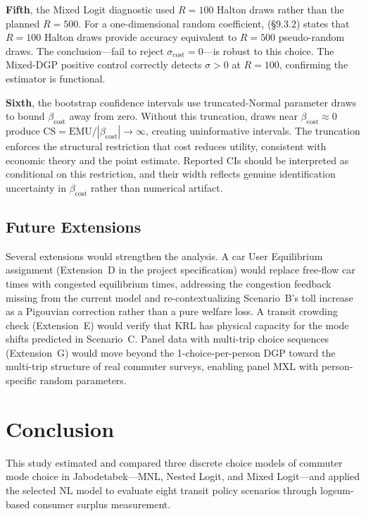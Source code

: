 \documentclass[12pt,a4paper]{article}
\begin{document}
\textbf{Fifth}, the Mixed Logit diagnostic used $R = 100$ Halton draws rather than the planned $R = 500$. For a one-dimensional random coefficient, \citet{train2009} (\S 9.3.2) states that $R = 100$ Halton draws provide accuracy equivalent to $R = 500$ pseudo-random draws. The conclusion---fail to reject $\sigma_{\text{cost}} = 0$---is robust to this choice. The Mixed-DGP positive control correctly detects $\sigma > 0$ at $R = 100$, confirming the estimator is functional.

\textbf{Sixth}, the bootstrap confidence intervals use truncated-Normal parameter draws to bound $\beta_{\text{cost}}$ away from zero. Without this truncation, draws near $\beta_{\text{cost}} \approx 0$ produce $\text{CS} = \text{EMU} / |\beta_{\text{cost}}| \to \infty$, creating uninformative intervals. The truncation enforces the structural restriction that cost reduces utility, consistent with economic theory and the \citet{ilahi2021} point estimate. Reported CIs should be interpreted as conditional on this restriction, and their width reflects genuine identification uncertainty in $\beta_{\text{cost}}$ rather than numerical artifact.

\subsection{Future Extensions}

Several extensions would strengthen the analysis. A car User Equilibrium assignment (Extension~D in the project specification) would replace free-flow car times with congested equilibrium times, addressing the congestion feedback missing from the current model and re-contextualizing Scenario~B's toll increase as a Pigouvian correction rather than a pure welfare loss. A transit crowding check (Extension~E) would verify that KRL has physical capacity for the mode shifts predicted in Scenario~C. Panel data with multi-trip choice sequences (Extension~G) would move beyond the 1-choice-per-person DGP toward the multi-trip structure of real commuter surveys, enabling panel MXL with person-specific random parameters.

\section{Conclusion}

This study estimated and compared three discrete choice models of commuter mode choice in Jabodetabek---MNL, Nested Logit, and Mixed Logit---and applied the selected NL model to evaluate eight transit policy scenarios through logsum-based consumer surplus measurement.
\end{document}

